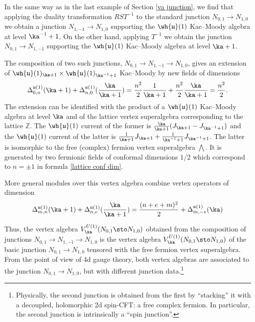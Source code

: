 \documentclass[11pt,reqno]{amsart}
\theoremstyle{plain}
\numberwithin{equation}{section}
\newcommand{\Z}{\mathbb{Z}}
\theoremstyle{definition}
\begin{document}
In the same way as in the last example of Section \ref{va junction},
we find that applying the duality transformation $RST^{-1}$ to the
standard junction $N_{0,1} \to N_{1,0}$ we obtain a junction $N_{1,-1}
\to N_{1,0}$ supporting the $\wh{\mathfrak{u}}(1)$ Kac--Moody algebra at
level $\ka^{-1}+1$. On the other hand, applying $T^{-1}$ we obtain
the junction $N_{0,1} \to N_{1,-1}$ supporting the $\wh{\mathfrak{u}}(1)$
Kac--Moody algebra at level $\ka+1$.

The composition of two such junctions, $N_{0,1} \to N_{1,-1}
\to N_{1,0}$, gives an extension of
$\wh{\mathfrak{u}}(1)_{\ka+1} \times \wh{\mathfrak{u}}(1)_{\ka^{-1}+1}$
Kac--Moody by new fields of dimensions
\begin{equation}    \label{lattice conf dim}
\Delta^{\mathfrak{u}(1)}_{0,n}(\ka+1) +
\Delta^{\mathfrak{u}(1)}_{n,0}(\frac{\ka}{\ka+1}) = \frac{n^2}{2}
\frac{1}{\ka+1} + \frac{n^2}{2}\frac{\ka}{\ka+1} = \frac{n^2}{2}.
\end{equation}
The extension can be identified with the product of a
$\wh{\mathfrak{u}}(1)$ Kac--Moody algebra at level $\ka$ and of the
lattice vertex superalgebra corresponding to the lattice $\Z$. The
$\wh{\mathfrak{u}}(1)$ current of the former is
$\frac{\ka}{\ka+1}(J_{\ka+1} - J_{\ka^{-1}+1})$ and the
$\wh{\mathfrak{u}}(1)$ current of the latter is
$\frac{1}{\ka+1}J_{\ka+1}+\frac{1}{\ka^{-1}+1} J_{\ka^{-1}+1}$. The
latter is isomorphic to the free (complex) fermion vertex superalgebra
$\bigwedge$. It is generated by two fermionic fields of conformal
dimensions $1/2$ which correspond to $n = \pm 1$ in formula
\eqref{lattice conf dim}.

More general modules over this vertex algebra combine vertex operators
of dimension
\begin{equation}
\Delta^{\mathfrak{u}(1)}_{m,n}(\ka+1) +
\Delta^{\mathfrak{u}(1)}_{n,e}(\frac{\ka}{\ka+1}) = \frac{(n+e+m)^2}{2}
+ \Delta^{\mathfrak{u}(1)}_{m,-e}(\ka)
\end{equation}

Thus, the vertex algebra $V^{U(1)}_\ka(N_{0,1}\sto N_{1,0})$ obtained
from the composition of junctions $N_{0,1} \to N_{1,-1} \to N_{1,0}$
is the vertex algebra $V^{U(1)}_\ka(N_{0,1}\sto N_{1,0})$ of the basic
junction $N_{0,1} \to N_{1,0}$ tensored with the free fermion vertex
superalgebra. From the point of view of 4d gauge theory, both vertex
algebras are associated to the junction $N_{0,1} \to N_{1,0}$, but
with different junction data.\footnote{Physically, the second junction
  is obtained from the first by ``stacking'' it with a decoupled,
  holomorphic 2d spin-CFT: a free complex fermion. In particular, the
  second junction is intrinsically a ``spin junction''.}
\end{document}

